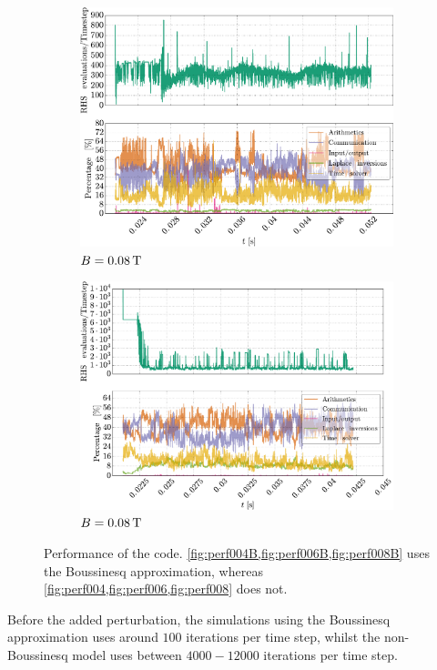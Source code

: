 \begin{figure}[htbp]
    \begin{subfigure}[h]{0.45\textwidth}
        \centering
        \includegraphics[width=1.0\textwidth]{fig/results/compareBouss/performance008B}
        \caption{$B=0.08\, \text{T}$}
        \label{fig:perf008B}
    \end{subfigure}
    \hfill
    \begin{subfigure}[h]{0.45\textwidth}
        \centering
        \includegraphics[width=1.0\textwidth]{fig/results/performance/performance008}
        \caption{$B=0.08\, \text{T}$}
        \label{fig:perf008}
    \end{subfigure}
    \caption{Performance of the code.
        \cref{fig:perf004B,fig:perf006B,fig:perf008B} uses the Boussinesq approximation, whereas \cref{fig:perf004,fig:perf006,fig:perf008} does not.}
    \label{fig:perfB}
\end{figure}
%
Before the added perturbation, the simulations using the Boussinesq approximation uses around $100$ iterations per time step, whilst the non-Boussinesq model uses between $4000 - 12000$ iterations per time step.

